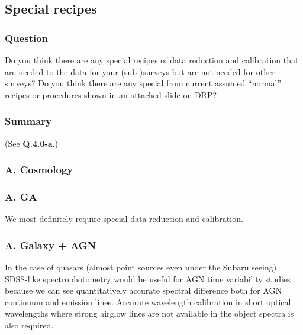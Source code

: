 \documentclass[a4paper,notitlepage]{article}
\begin{document}
\subsection{Special recipes}

\subsubsection{Question}
Do you think there are any special recipes of data reduction 
      and calibration that are needed to the data for your
      (sub-)surveys but are not needed for other surveys?
      Do you think there are any special from 
      current assumed ``normal'' recipes or procedures shown in an 
      attached slide on DRP?  

\subsubsection{Summary}

(See {\bf Q.4.0-a}.)

\subsubsection{A. Cosmology}

\subsubsection{A. GA}
We most definitely require special data reduction and calibration. 

\subsubsection{A. Galaxy + AGN}
In the case of quasars (almost point sources even under the Subaru 
seeing), SDSS-like spectrophotometry would be useful for AGN time 
variability studies because we can see quantitatively accurate 
spectral difference both for AGN continuum and emission lines. 
Accurate wavelength calibration in short optical 
wavelengths where strong airglow lines are not available in the 
object spectra is also required.


\end{document}
